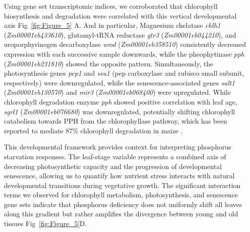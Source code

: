 \documentclass[9pt,twocolumn,twoside]{rilabRxiv}
\newcommand{\invfour}{\textit{Inv4m}\xspace}
\begin{document}
Using gene set transcriptomic indices, we corroborated that chlorophyll biosynthesis and degradation were correlated with this vertical developmental axis Fig~\ref{fig:Figure_5} A. 
And in particular, Magnesium chelatase \textit{chlh1} (\textit{Zm00001eb433610}), glutamyl-tRNA reductase \textit{gtr3} (\textit{Zm00001eb044210}), and uroporphyrinogen decarboxylase \textit{urod} (\textit{Zm00001eb358510}) consistently decreased expression with each successive sample downwards, while the pheophytinase \textit{pph} (\textit{Zm00001eb231810}) showed the opposite pattern. 
Simultaneously, the photosynthesis genes \textit{pep1} and \textit{ssu1} (pep carboxylase and rubisco small subunit, respectively)  were downregulated, while the senescence-associated genes \textit{salt1} (\textit{Zm00001eb130570}) and \textit{mir3}  (\textit{Zm00001eb068400}) were upregulated.
While chlorophyll degradation enzyme \textit{pph} showed positive correlation with leaf age,  \textit{sgrl1} (\textit{Zm00001eb076680}) was downregulated, potentially shifting chlorophyll catabolism towards PPH  from the chlorophyllase pathway, which has been reported to mediate  87\% chlorophyll degradation in maize \cite{wei2025}.


This developmental framework provides context for interpreting phosphorus starvation responses.
The leaf-stage variable represents a combined axis of decreasing photosynthetic capacity and the progression of developmental senescence, allowing us to quantify how nutrient stress interacts with natural developmental transitions during vegetative growth.
The significant interaction terms we observed for chlorophyll metabolism, photosynthesis, and senescence gene sets indicate that phosphorus deficiency does not uniformly shift all leaves along this gradient but rather amplifies the divergence between young and old tissues Fig~\ref{fig:Figure_5}D.
\end{document}
